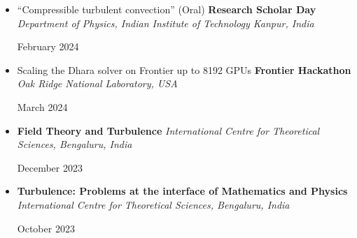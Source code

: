 \documentclass[10pt,a4paper]{article}
\begin{document}
\begin{itemize}[leftmargin=1.5em, itemsep=6pt, parsep=0pt]
  \item \begin{minipage}[t]{0.80\linewidth}
          ``Compressible turbulent convection'' (Oral) \newline
          \textbf{Research Scholar Day} \newline
          \textit{Department of Physics, Indian Institute of Technology Kanpur, India}
        \end{minipage}%
        \begin{minipage}[t]{0.20\linewidth}
          \raggedleft
          February 2024
        \end{minipage}

  \item \begin{minipage}[t]{0.80\linewidth}
          Scaling the Dhara solver on Frontier up to 8192 GPUs \newline
          \textbf{Frontier Hackathon} \newline
          \textit{Oak Ridge National Laboratory, USA}
        \end{minipage}%
        \begin{minipage}[t]{0.20\linewidth}
          \raggedleft
          March 2024
        \end{minipage}

  \item \begin{minipage}[t]{0.80\linewidth}
          \textbf{Field Theory and Turbulence} \newline
          \textit{International Centre for Theoretical Sciences, Bengaluru, India}
        \end{minipage}%
        \begin{minipage}[t]{0.20\linewidth}
          \raggedleft
          December 2023
        \end{minipage}

  \item \begin{minipage}[t]{0.80\linewidth}
          \textbf{Turbulence: Problems at the interface of Mathematics and Physics} \newline
          \textit{International Centre for Theoretical Sciences, Bengaluru, India}
        \end{minipage}%
        \begin{minipage}[t]{0.20\linewidth}
          \raggedleft
          October 2023
        \end{minipage}


\end{itemize}
\end{document}
